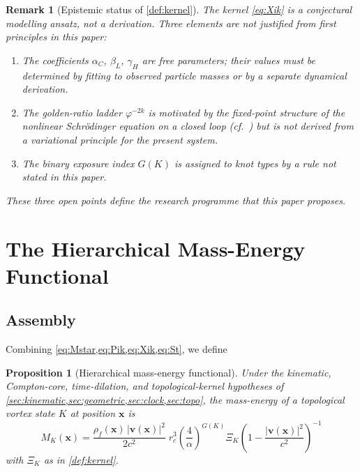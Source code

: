 \documentclass[11pt, a4paper]{article}
\newtheorem{proposition}{Proposition}
\newtheorem{remark}{Remark}
\newcommand{\rc}{r_c}        %
\newcommand{\rhof}{\rho_f}   %
\begin{document}
\begin{remark}[Epistemic status of \cref{def:kernel}]
The kernel \eqref{eq:Xik} is a \emph{conjectural modelling
ansatz}, not a derivation.
Three elements are not justified from first principles in this
paper:
\begin{enumerate}[label=(\roman*)]
  \item The coefficients $\alpha_C$, $\beta_L$, $\gamma_H$
        are free parameters; their values must be determined
        by fitting to observed particle masses or by a
        separate dynamical derivation.
  \item The golden-ratio ladder $\varphi^{-2k}$ is motivated
        by the fixed-point structure of the nonlinear
        Schr\"{o}dinger equation on a closed loop
        (cf.~\cite{Pitaevskii1961,Pethick2008}) but is not
        derived from a variational principle for the present
        system.
  \item The binary exposure index $G(K)$ is assigned to knot
        types by a rule not stated in this paper.
\end{enumerate}
These three open points define the research programme that
this paper proposes.
\end{remark}

\section{The Hierarchical Mass-Energy Functional}
\label{sec:master}

\subsection{Assembly}
\label{sec:assembly}

Combining \cref{eq:Mstar,eq:Pik,eq:Xik,eq:St}, we define

\begin{proposition}[Hierarchical mass-energy functional]
\label{prop:master}
Under the kinematic, Compton-core, time-dilation, and
topological-kernel hypotheses of
\cref{sec:kinematic,sec:geometric,sec:clock,sec:topo},
the mass-energy of a topological vortex state $K$ at
position $\mathbf{x}$ is
\begin{equation}
  \boxed{
    M_K(\mathbf{x})
    = \frac{\rhof(\mathbf{x})\,|\mathbf{v}(\mathbf{x})|^2}{2c^2}
      \;\rc^3
      \left(\frac{4}{\alpha}\right)^{G(K)}
      \Xi_K
      \left(1-\frac{|\mathbf{v}(\mathbf{x})|^2}{c^2}\right)^{-1}
  }
  \label{eq:master}
\end{equation}
with $\Xi_K$ as in \cref{def:kernel}.
\end{proposition}
\end{document}
